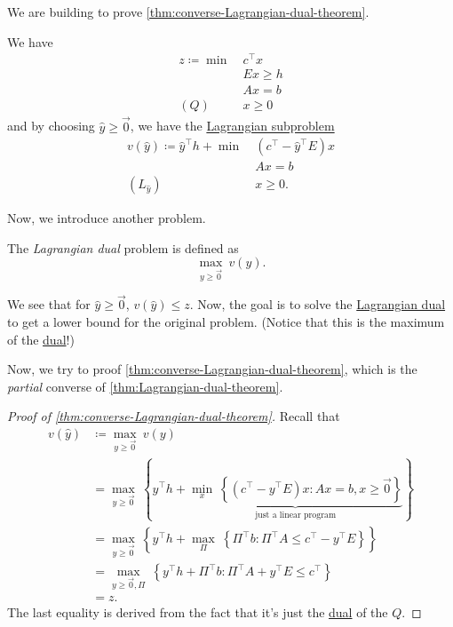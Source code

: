 We are building to prove \autoref{thm:converse-Lagrangian-dual-theorem}.
\begin{prev}
	We have
	\begin{align*}
		z\coloneqq \min~ & c^{\top}x \\
		                 & Ex \geq h \\
		                 & Ax = b    \\
		(Q)\quad         & x\geq 0
	\end{align*}
	and by choosing \(\hat{y}\geq \vec{0}\), we have the \hyperref[def:Lagrangian-subproblem]{Lagrangian subproblem}
	\begin{align*}
		v(\hat{y})\coloneqq \hat{y}^{\top}h + \min~ & (c^{\top} - \hat{y}^{\top}E)x \\
		                                            & Ax = b                        \\
		(L_{\hat{y}})\quad                          & x\geq 0.
	\end{align*}
\end{prev}

Now, we introduce another problem.
\begin{definition}\label{def:Lagrangian-dual}
	The \emph{Lagrangian dual} problem is defined as
	\[
		\max_{y\geq \vec{0}}\ v(y).
	\]
\end{definition}

\begin{note}
	We see that for \(\hat{y}\geq \vec{0}\), \(v(\hat{y})\leq z\). Now, the goal is to solve the
	\hyperref[def:Lagrangian-dual]{Lagrangian dual} to get a lower bound for the original problem. (Notice that this is the maximum of the \hyperref[def:dual]{dual}!)
\end{note}

Now, we try to proof \autoref{thm:converse-Lagrangian-dual-theorem}, which is the \emph{partial} converse of \autoref{thm:Lagrangian-dual-theorem}.
\begin{proof}[Proof of \autoref{thm:converse-Lagrangian-dual-theorem}]
	Recall that
	\[
		\begin{split}
			v(\hat{y})&\coloneqq \max_{y\geq \vec{0}}\ v(y) \\
			&= \max_{y\geq \vec{0}}\ \left\{y^{\top}h + \underbrace{\min_{x}\ \left\{(c^{\top} - y^{\top}E)x\colon Ax = b, x\geq \vec{0}\right\}}_{\text{just a linear program}}\right\}\\
			&= \max_{y\geq \vec{0}}\ \left\{y^{\top}h + \max_{\Pi}\ \left\{\Pi^{\top}b\colon \Pi^{\top}A\leq c^{\top} - y^{\top}E\right\}\right\}\\
			&= \max_{y\geq \vec{0}, \Pi}\ \left\{y^{\top}h + \Pi^{\top}b\colon \Pi^{\top}A + y^{\top}E\leq c^{\top}\right\}\\
			&= z.
		\end{split}
	\]
	The last equality is derived from the fact that it's just the \hyperref[def:dual]{dual} of the \(Q\).
\end{proof}


